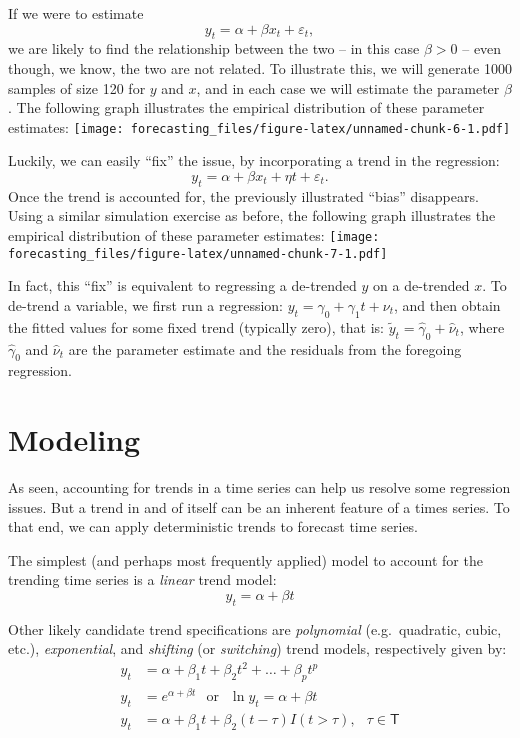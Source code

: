 \documentclass[
  oneside]{book}
\begin{document}
If we were to estimate \[y_t = \alpha+\beta x_t + \varepsilon_t,\] we are likely to find the relationship between the two -- in this case \(\beta>0\) -- even though, we know, the two are not related. To illustrate this, we will generate 1000 samples of size 120 for \(y\) and \(x\), and in each case we will estimate the parameter \(\beta\). The following graph illustrates the empirical distribution of these parameter estimates:
\texttt{[image: forecasting\_files/figure-latex/unnamed-chunk-6-1.pdf]}

Luckily, we can easily ``fix'' the issue, by incorporating a trend in the regression: \[y_t = \alpha+\beta x_t + \eta t + \varepsilon_t.\] Once the trend is accounted for, the previously illustrated ``bias'' disappears. Using a similar simulation exercise as before, the following graph illustrates the empirical distribution of these parameter estimates:
\texttt{[image: forecasting\_files/figure-latex/unnamed-chunk-7-1.pdf]}

In fact, this ``fix'' is equivalent to regressing a de-trended \(y\) on a de-trended \(x\). To de-trend a variable, we first run a regression: \(y_t = \gamma_0 + \gamma_1 t + \nu_t\), and then obtain the fitted values for some fixed trend (typically zero), that is: \(\tilde{y}_t = \hat{\gamma}_0+\hat{\nu}_t\), where \(\hat{\gamma}_0\) and \(\hat{\nu}_t\) are the parameter estimate and the residuals from the foregoing regression.

\hypertarget{modeling}{%
\section{Modeling}\label{modeling}}

As seen, accounting for trends in a time series can help us resolve some regression issues. But a trend in and of itself can be an inherent feature of a times series. To that end, we can apply deterministic trends to forecast time series.

The simplest (and perhaps most frequently applied) model to account for the trending time series is a \emph{linear} trend model: \[y_t = \alpha + \beta t\]

Other likely candidate trend specifications are \emph{polynomial} (e.g.~quadratic, cubic, etc.), \emph{exponential}, and \emph{shifting} (or \emph{switching}) trend models, respectively given by:
\[\begin{aligned}
    y_t &= \alpha + \beta_1 t + \beta_2 t^2 + \ldots + \beta_p t^p \\
    y_t &= e^{\alpha + \beta t}\;~~\mbox{or}\;~~\ln{y_t} = \alpha + \beta t \\
    y_t &= \alpha + \beta_1 t + \beta_2 (t-\tau)I(t>\tau),\;~~\tau\in\mathsf{T} 
    \end{aligned}\]
\end{document}
